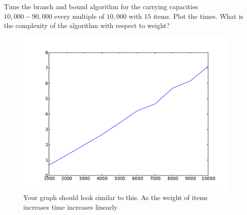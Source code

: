 \begin{problem}
Time the branch and bound algorithm for the carrying capacities $10,000-90,000$ every multiple of $10,000$ with $15$ items.
Plot the times.
What is the complexity of the algorithm with respect to weight?

\begin{figure}[H]
\includegraphics[width=\textwidth]{dynamicWeight.pdf}
\caption{
Your graph should look similar to this.
As the weight of items increases time increases linearly}
\end{figure}
\end{problem}